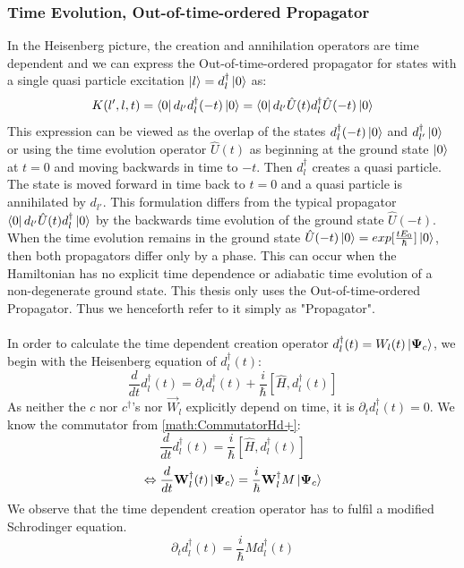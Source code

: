 \documentclass[Master]{subfiles}
\begin{document}
\subsubsection{Time Evolution, Out-of-time-ordered Propagator}\label{sec:Propagator}
In the Heisenberg picture, the creation and annihilation operators are time dependent and we can express the Out-of-time-ordered propagator for states with a single quasi particle excitation $\ket{l}=d^{\dag}_l\ket{0}$ as:
$$
K(l',l,t) = \bra{0}d_{l'}d^{\dag}_l(-t)\ket{0}
= \bra{0}d_{l'}\hat{U}(t)d^{\dag}_l\hat{U}(-t)\ket{0} 
$$
This expression can be viewed as the overlap of the states $d^{\dag}_l(-t)\ket{0}$ and $d^{\dag}_{l'}\ket{0}$ or using the time evolution operator $\hat{U}(t)$ as beginning at the ground state $\ket{0}$ at $t=0$ and moving backwards in time to $-t$. Then $d_l^{\dag}$ creates a quasi particle. The state is moved forward in time back to $t=0$ and a quasi particle is annihilated by $d_{l'}$. This formulation differs from the typical propagator $\bra{0}d_{l'}\hat{U}(t)d^{\dag}_l\ket{0}$ by the backwards time evolution of the ground state $\hat{U}(-t)$. When the time evolution remains in the ground state $\hat{U}(-t)\ket{0} = exp[\frac{t E_0}{\hbar}] \ket{0}$, then both propagators differ only by a phase. This can occur when the Hamiltonian has no explicit time dependence or adiabatic time evolution of a non-degenerate ground state. This thesis only uses the Out-of-time-ordered Propagator. Thus we henceforth refer to it simply as "Propagator".\\
\\
In order to calculate the time dependent creation operator 
$ d^{\dag}_l(t) = W_l(t)\ket{\mathbf{\Psi}_c}$, we begin with the Heisenberg equation of $d^{\dag}_l(t)$:
$$\frac{d}{dt} d^{\dag}_l(t) = \partial_t  d^{\dag}_l(t) + \frac{i}{\hbar} [\hat{H}, d^{\dag}_l(t)]$$
As neither the $c$ nor $c^{\dag}$'s nor  $\vec{W}_l$ explicitly depend on time, it is $\partial_t  d^{\dag}_l(t) = 0$. We know the commutator from \eqref{math:CommutatorHd+}:
$$
\frac{d}{dt} d^{\dag}_l(t) = \frac{i}{\hbar} [\hat{H}, d^{\dag}_l(t)]
$$
$$
\Leftrightarrow 
\frac{d}{d t} \mathbf{W}^{\dag}_l(t)
\ket{\mathbf{\Psi}_c}
= \frac{i}{\hbar}
\mathbf{W}^{\dag}_l M
\ket{\mathbf{\Psi}_c}
$$
We observe that the time dependent creation operator has to fulfil a modified Schrodinger equation.
\begin{dmath} \label{math:OperatorSchroedinger}
\partial_t  d^{\dag}_l(t) = \frac{i}{\hbar} M  d^{\dag}_l(t)
\end{dmath}
\end{document}
